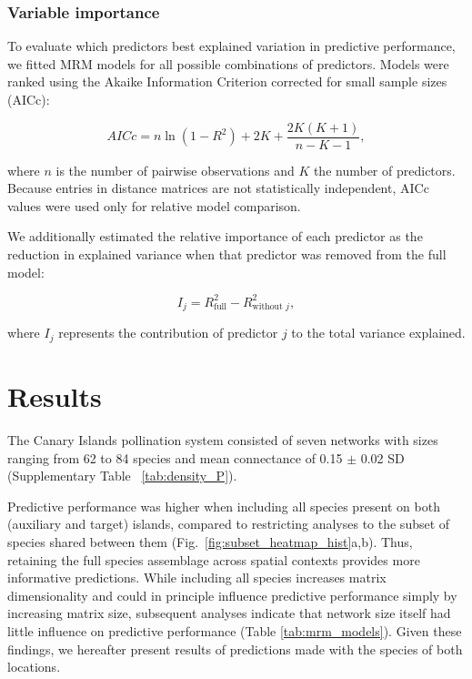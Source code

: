 \documentclass[oneside, a4paper, onecolumn, 11pt]{article}
\newcommand{\revtag}[1]{\textcolor{softcoral}{[#1]}}
\begin{document}
\subsubsection{Variable importance}
To evaluate which predictors best explained variation in predictive performance, we fitted MRM models for all possible combinations of predictors. Models were ranked using the Akaike Information Criterion corrected for small sample sizes (AICc):

\begin{equation}
AICc = n \ln(1 - R^2) + 2K + \frac{2K(K+1)}{n-K-1},
\end{equation}

where $n$ is the number of pairwise observations and $K$ the number of predictors. Because entries in distance matrices are not statistically independent, AICc values were used only for relative model comparison.

We additionally estimated the relative importance of each predictor as the reduction in explained variance when that predictor was removed from the full model:

\begin{equation}
I_j = R^2_{\text{full}} - R^2_{\text{without } j},
\end{equation}

where $I_j$ represents the contribution of predictor $j$ to the total variance explained. %

\hfill
\section{Results}
The Canary Islands pollination system consisted of seven networks with sizes ranging from 62 to 84 species and mean connectance of 0.15 $\pm$ 0.02 SD (Supplementary Table ~\ref{tab:density_P}).

Predictive performance was higher when including all species present on both (auxiliary and target) islands, compared to restricting analyses to the subset of species shared between them (Fig.~\ref{fig:subset_heatmap_hist}a,b). Thus, retaining the full species assemblage across spatial contexts provides more informative predictions. While including all species increases matrix dimensionality and could in principle influence predictive performance simply by increasing matrix size, subsequent analyses indicate that network size itself had little influence on predictive performance (Table \ref{tab:mrm_models}). %
Given these findings, we hereafter present results of predictions made with the species of both locations. 
\end{document}
